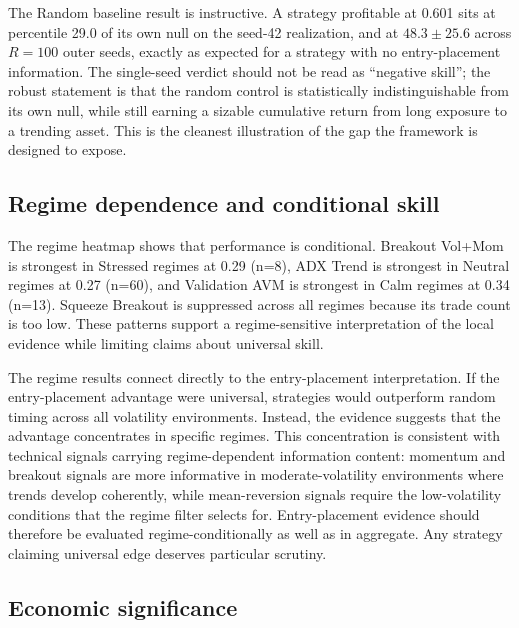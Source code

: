 \documentclass[preprint,12pt]{elsarticle}
\theoremstyle{definition}
\begin{document}
The Random baseline result is instructive. A strategy profitable at 0.601 sits at percentile 29.0 of its own null on the seed-42 realization, and at $48.3\pm 25.6$ across $R=100$ outer seeds, exactly as expected for a strategy with no entry-placement information. The single-seed verdict should not be read as ``negative skill''; the robust statement is that the random control is statistically indistinguishable from its own null, while still earning a sizable cumulative return from long exposure to a trending asset. This is the cleanest illustration of the gap the framework is designed to expose.

\subsection{Regime dependence and conditional skill}

The regime heatmap shows that performance is conditional. Breakout Vol+Mom is strongest in Stressed regimes at 0.29 (n=8), ADX Trend is strongest in Neutral regimes at 0.27 (n=60), and Validation AVM is strongest in Calm regimes at 0.34 (n=13). Squeeze Breakout is suppressed across all regimes because its trade count is too low. These patterns support a regime-sensitive interpretation of the local evidence while limiting claims about universal skill.

The regime results connect directly to the entry-placement interpretation. If the entry-placement advantage were universal, strategies would outperform random timing across all volatility environments. Instead, the evidence suggests that the advantage concentrates in specific regimes. This concentration is consistent with technical signals carrying regime-dependent information content: momentum and breakout signals are more informative in moderate-volatility environments where trends develop coherently, while mean-reversion signals require the low-volatility conditions that the regime filter selects for. Entry-placement evidence should therefore be evaluated regime-conditionally as well as in aggregate. Any strategy claiming universal edge deserves particular scrutiny.

\subsection{Economic significance}
\end{document}

